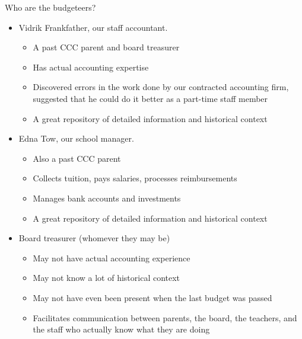 \documentclass[8pt]{beamer}
\begin{document}
\begin{frame}{Who are the budgeteers?}
%
\begin{itemize}
%
\item Vidrik Frankfather, our staff accountant.
\begin{itemize}
    \item A past CCC parent and board treasurer
    \item Has actual accounting expertise
    \item Discovered errors in the work done by our contracted accounting firm,
        suggested that he could do it better as a part-time staff member
    \item A great repository of detailed information and historical context
\end{itemize}
%
%
\item Edna Tow, our school manager.
\begin{itemize}
    \item Also a past CCC parent
    \item Collects tuition, pays salaries, processes reimbursements
    \item Manages bank accounts and investments
    \item A great repository of detailed information and historical context
\end{itemize}
%
%
\item Board treasurer (whomever they may be)
\begin{itemize}
    \item May not have actual accounting experience
    \item May not know a lot of historical context
    \item May not have even been present when the last budget was passed
    \item Facilitates communication between parents, the board, the teachers,
        and the staff who actually know what they are doing
\end{itemize}
%
\end{itemize}
%
\end{frame}
\end{document}
